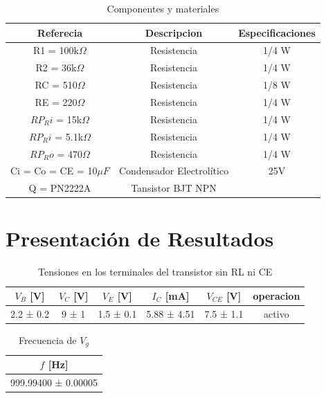\documentclass[12pt, a4paper]{article}
\begin{document}
    \begin{table}[h!]
        \centering
        \caption{Componentes y materiales}
        \label{tab:componentes}
        \begin{tabular}{|c|c|c|} \hline
            Referecia&Descripcion&    Especificaciones   \\ \hline
            R1 = 100k$\Omega$  &  Resistencia&         1/4 W         \\
            R2 = 36k$\Omega$   &  Resistencia&         1/4 W         \\
            RC = 510$\Omega$   &  Resistencia&         1/8 W         \\
            RE = 220$\Omega$   &  Resistencia&         1/4 W         \\
            $RP_Ri$ = 15k$\Omega$   &  Resistencia&         1/4 W         \\
            $RP_Ri$ = 5.1k$\Omega$   &  Resistencia&         1/4 W         \\
            $RP_Ro$ = 470$\Omega$   &  Resistencia&         1/4 W         \\
            Ci = Co = CE = 10$\mu F$ & Condensador Electrolítico & 25V \\
            Q = PN2222A    &Tansistor BJT NPN&   \\ \hline
        \end{tabular}
    \end{table}

    \newpage

    \section{Presentación de Resultados}

    \begin{table}[h!]
        \centering
        \caption{Tensiones en los terminales del transistor sin RL ni CE}
        \label{tab:Q}
        \begin{tabular}{|c|c|c|c|c|c|} \hline
            $V_B$ [V]  &  $V_C$ [V] &  $V_E$ [V]  &  $I_C$ [mA] & $V_{CE}$ [V] & operacion \\ \hline
            2.2 ± 0.2  &  9 ± 1     &  1.5 ± 0.1  &  5.88 ± 4.51  &  7.5 ± 1.1 & activo \\ \hline
        \end{tabular}
    \end{table}

    \begin{table}[h!]
        \centering
        \caption{Frecuencia de $V_g$}
        \label{tab:f}
        \begin{tabular}{|c|} \hline
            $f$ [Hz]   \\ \hline
            999.99400 ± 0.00005   \\ \hline
        \end{tabular}
    \end{table}
\end{document}
